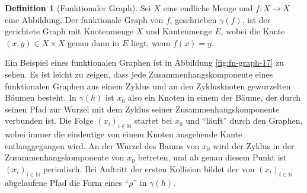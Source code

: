 \documentclass[a4paper, 11pt, ngerman]{article}
\newcommand{\N}{\mathbb{N}}
\theoremstyle{definition}
\newtheorem{definition}{Definition}
\theoremstyle{plain}
\theoremstyle{remark}
\begin{document}
\begin{definition}[Funktionaler Graph]
    Sei $X$ eine endliche Menge und $f: X \to X$ eine Abbildung. Der funktionale Graph von $f$, geschrieben $\gamma(f)$, ist der gerichtete Graph mit Knotenmenge $X$ und Kantenmenge $E$, wobei die Kante $(x, y) \in X \times X$ genau dann in $E$ liegt, wenn $f(x) = y$.
\end{definition}

Ein Beispiel eines funktionalen Graphen ist in Abbildung \ref{fig:fn-graph-17} zu sehen. Es ist leicht zu zeigen, dass jede Zusammenhangskomponente eines funktionalen Graphen aus einem Zyklus und an den Zyklusknoten gewurzelten Bäumen besteht. In $\gamma(h)$ ist $x_0$ also ein Knoten in einem der Bäume, der durch seinen Pfad zur Wurzel mit dem Zyklus seiner Zusammenhangskomponente verbunden ist. Die Folge $(x_i)_{i \in \N}$ startet bei $x_0$ und "`läuft"' durch den Graphen, wobei immer die eindeutige von einem Knoten ausgehende Kante entlanggegangen wird. An der Wurzel des Baums von $x_0$ wird der Zyklus in der Zusammenhangskomponente von $x_0$ betreten, und ab genau diesem Punkt ist $(x_i)_{i \in \N}$ periodisch. Bei Auftritt der ersten Kollision bildet der von $(x_i)_{i \in \N}$ abgelaufene Pfad die Form eines "`$\rho$"' in $\gamma(h)$.
\end{document}
